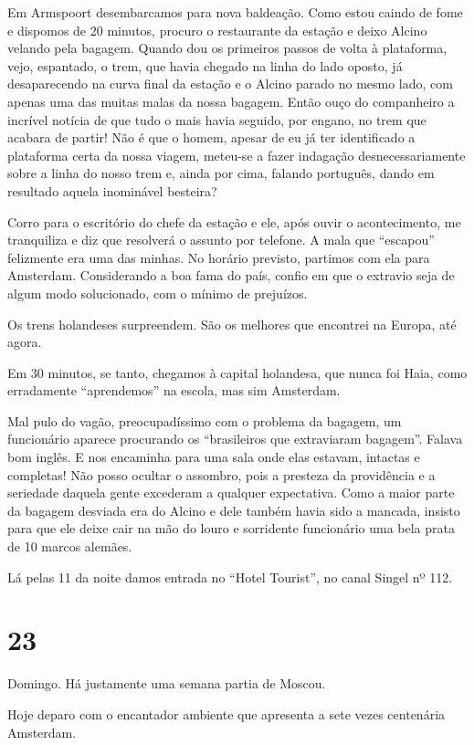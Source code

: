 Em Armspoort desembarcamos para nova baldeação. Como estou caindo de fome e dispomos de 20 minutos, procuro o restaurante da estação e deixo Alcino velando pela bagagem. Quando dou os primeiros passos de volta à plataforma, vejo, espantado, o trem, que havia chegado na linha do lado oposto, já desaparecendo na curva final da estação e o Alcino parado no mesmo lado, com apenas uma das muitas malas da nossa bagagem. Então ouço do companheiro a incrível notícia de que tudo o mais havia seguido, por engano, no trem que acabara de partir! Não é que o homem, apesar de eu já ter identificado a plataforma certa da nossa viagem, meteu-se a fazer indagação desnecessariamente sobre a linha do nosso trem e, ainda por cima, falando português, dando em resultado aquela inominável besteira?

Corro para o escritório do chefe da estação e ele, após ouvir o acontecimento, me tranquiliza e diz que resolverá o assunto por telefone. A mala que ``escapou'' felizmente era uma das minhas. No horário previsto, partimos com ela para Amsterdam. Considerando a boa fama do país, confio em que o extravio seja de algum modo solucionado, com o mínimo de prejuízos.

Os trens holandeses surpreendem. São os melhores que encontrei na Europa, até agora.

Em 30 minutos, se tanto, chegamos à capital holandesa, que nunca foi Haia, como erradamente ``aprendemos'' na escola, mas sim Amsterdam.

Mal pulo do vagão, preocupadíssimo com o problema da bagagem, um funcionário aparece procurando os ``brasileiros que extraviaram bagagem''. Falava bom inglês. E nos encaminha para uma sala onde elas estavam, intactas e completas! Não posso ocultar o assombro, pois a presteza da providência e a seriedade daquela gente excederam a qualquer expectativa. Como a maior parte da bagagem desviada era do Alcino e dele também havia sido a mancada, insisto para que ele deixe cair na mão do louro e sorridente funcionário uma bela prata de 10 marcos alemães.

Lá pelas 11 da noite damos entrada no ``Hotel Tourist'', no canal Singel nº 112.

\section*{23 \adfflatleafright {}}
Domingo. Há justamente uma semana partia de Moscou.

Hoje deparo com o encantador ambiente que apresenta a sete vezes centenária Amsterdam.

